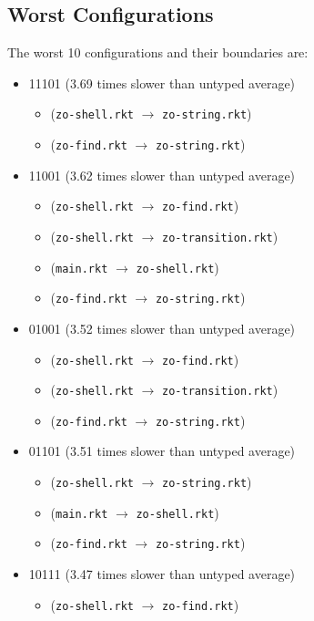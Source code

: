 \documentclass{article}
\newcommand{\mono}[1]{\texttt{#1}}
\begin{document}
\subsection{Worst Configurations}
The worst 10 configurations and their boundaries are:
\begin{itemize}
\item 11101 (3.69 times slower than untyped average)
  \begin{itemize}
  \item (\mono{zo-shell.rkt} $\rightarrow$ \mono{zo-string.rkt})
  \item (\mono{zo-find.rkt} $\rightarrow$ \mono{zo-string.rkt})
  \end{itemize}
\item 11001 (3.62 times slower than untyped average)
  \begin{itemize}
  \item (\mono{zo-shell.rkt} $\rightarrow$ \mono{zo-find.rkt})
  \item (\mono{zo-shell.rkt} $\rightarrow$ \mono{zo-transition.rkt})
  \item (\mono{main.rkt} $\rightarrow$ \mono{zo-shell.rkt})
  \item (\mono{zo-find.rkt} $\rightarrow$ \mono{zo-string.rkt})
  \end{itemize}
\item 01001 (3.52 times slower than untyped average)
  \begin{itemize}
  \item (\mono{zo-shell.rkt} $\rightarrow$ \mono{zo-find.rkt})
  \item (\mono{zo-shell.rkt} $\rightarrow$ \mono{zo-transition.rkt})
  \item (\mono{zo-find.rkt} $\rightarrow$ \mono{zo-string.rkt})
  \end{itemize}
\item 01101 (3.51 times slower than untyped average)
  \begin{itemize}
  \item (\mono{zo-shell.rkt} $\rightarrow$ \mono{zo-string.rkt})
  \item (\mono{main.rkt} $\rightarrow$ \mono{zo-shell.rkt})
  \item (\mono{zo-find.rkt} $\rightarrow$ \mono{zo-string.rkt})
  \end{itemize}
\item 10111 (3.47 times slower than untyped average)
  \begin{itemize}
  \item (\mono{zo-shell.rkt} $\rightarrow$ \mono{zo-find.rkt})

\end{itemize}
\end{itemize}
\end{document}
